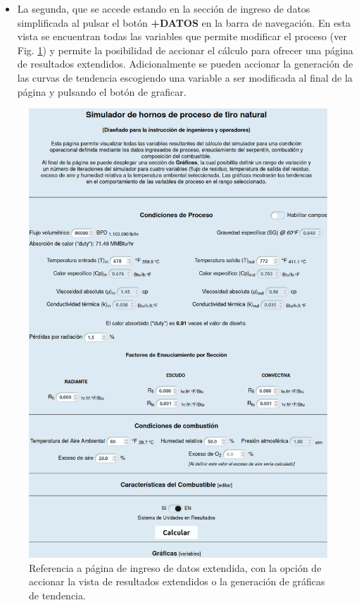 \begin{itemize}
    \item La segunda, que se accede estando en la sección de ingreso de datos simplificada al pulsar el botón \textbf{+DATOS} en la barra de navegación. En esta vista se encuentran todas las variables que permite modificar el proceso (ver Fig. \ref{fig:fulldatos}) y permite la posibilidad de accionar el cálculo para ofrecer una página de resultados extendidos. Adicionalmente se pueden accionar la generación de las curvas de tendencia escogiendo una variable a ser modificada al final de la página y pulsando el botón de graficar.
\end{itemize}
\begin{figure}[H] \begin{center}
\includegraphics[scale=0.3]{images/datos2}
\caption[Página de ingreso de datos extendida]{Referencia a página de ingreso de datos extendida, con la opción de accionar la vista de resultados extendidos o la generación de gráficas de tendencia.}
\label{fig:fulldatos}
\end{center} \end{figure}
